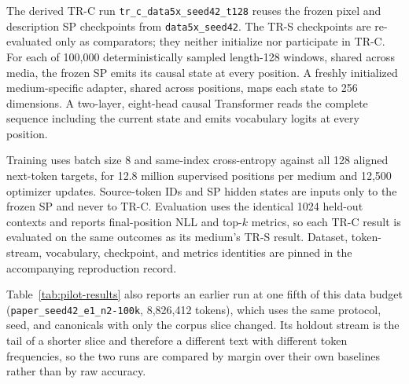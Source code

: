 \documentclass[11pt,a4paper]{article}
\begin{document}
The derived TR-C run \texttt{tr\_c\_data5x\_seed42\_t128} reuses the frozen pixel and description SP checkpoints from \texttt{data5x\_seed42}. The TR-S checkpoints are re-evaluated only as comparators; they neither initialize nor participate in TR-C. For each of 100,000 deterministically sampled length-128 windows, shared across media, the frozen SP emits its causal state at every position. A freshly initialized medium-specific adapter, shared across positions, maps each state to 256 dimensions. A two-layer, eight-head causal Transformer reads the complete sequence including the current state and emits vocabulary logits at every position.

Training uses batch size 8 and same-index cross-entropy against all 128 aligned next-token targets, for 12.8 million supervised positions per medium and 12,500 optimizer updates. Source-token IDs and SP hidden states are inputs only to the frozen SP and never to TR-C. Evaluation uses the identical 1024 held-out contexts and reports final-position NLL and top-$k$ metrics, so each TR-C result is evaluated on the same outcomes as its medium's TR-S result. Dataset, token-stream, vocabulary, checkpoint, and metrics identities are pinned in the accompanying reproduction record.

Table~\ref{tab:pilot-results} also reports an earlier run at one fifth of this data budget (\texttt{paper\_seed42\_e1\_n2-100k}, 8,826,412 tokens), which uses the same protocol, seed, and canonicals with only the corpus slice changed. Its holdout stream is the tail of a shorter slice and therefore a different text with different token frequencies, so the two runs are compared by margin over their own baselines rather than by raw accuracy.
\end{document}
